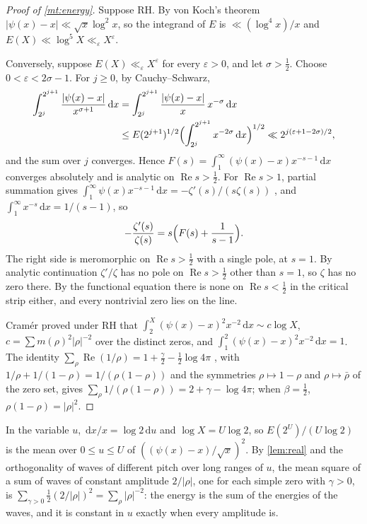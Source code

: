 \documentclass[11pt]{article}
\theoremstyle{definition}\newtheorem{definition}[theorem]{Definition}
\theoremstyle{remark}\newtheorem{remark}[theorem]{Remark}
\newcommand{\dd}{\,\mathrm d}\newcommand{\e}{\mathrm e}
\renewcommand{\Re}{\operatorname{Re}}\renewcommand{\Im}{\operatorname{Im}}
\begin{document}
\begin{proof}[Proof of \cref{mt:energy}]
Suppose RH. By von Koch's theorem \cite{vonKoch} $|\psi(x)-x|\ll\sqrt x\log^2x$, so the integrand of $E$ is $\ll(\log^4x)/x$ and $E(X)\ll\log^5X\ll_\varepsilon X^\varepsilon$.

Conversely, suppose $E(X)\ll_\varepsilon X^\varepsilon$ for every $\varepsilon>0$, and let $\sigma>\frac12$. Choose $0<\varepsilon<2\sigma-1$. For $j\ge0$, by Cauchy--Schwarz,
\begin{align*}
\int_{2^j}^{2^{j+1}}\frac{|\psi(x)-x|}{x^{\sigma+1}}\dd x&=\int_{2^j}^{2^{j+1}}\frac{|\psi(x)-x|}{x}\,x^{-\sigma}\dd x\\
&\le E(2^{j+1})^{1/2}\Bigl(\int_{2^j}^{2^{j+1}}x^{-2\sigma}\dd x\Bigr)^{1/2}\ll2^{j(\varepsilon+1-2\sigma)/2},
\end{align*}
and the sum over $j$ converges. Hence $F(s)=\int_1^\infty(\psi(x)-x)x^{-s-1}\dd x$ converges absolutely and is analytic on $\Re s>\frac12$. For $\Re s>1$, partial summation gives $\int_1^\infty\psi(x)x^{-s-1}\dd x=-\zeta'(s)/(s\zeta(s))$ \cite[Ch.~17]{Davenport}, and $\int_1^\infty x^{-s}\dd x=1/(s-1)$, so
\[
-\frac{\zeta'(s)}{\zeta(s)}=s\Bigl(F(s)+\frac1{s-1}\Bigr).
\]
The right side is meromorphic on $\Re s>\frac12$ with a single pole, at $s=1$. By analytic continuation $\zeta'/\zeta$ has no pole on $\Re s>\frac12$ other than $s=1$, so $\zeta$ has no zero there. By the functional equation there is none on $\Re s<\frac12$ in the critical strip either, and every nontrivial zero lies on the line.

Cramér \cite{Cramer} proved under RH that $\int_2^X(\psi(x)-x)^2x^{-2}\dd x\sim c\log X$, $c=\sum m(\rho)^2|\rho|^{-2}$ over the distinct zeros, and $\int_1^2(\psi(x)-x)^2x^{-2}\dd x=1$. The identity $\sum_\rho\Re(1/\rho)=1+\frac\gamma2-\frac12\log4\pi$ \cite[Ch.~12]{Davenport}, with $1/\rho+1/(1-\rho)=1/(\rho(1-\rho))$ and the symmetries $\rho\mapsto1-\rho$ and $\rho\mapsto\bar\rho$ of the zero set, gives $\sum_\rho1/(\rho(1-\rho))=2+\gamma-\log4\pi$; when $\beta=\frac12$, $\rho(1-\rho)=|\rho|^2$.
\end{proof}

In the variable $u$, $\dd x/x=\log2\dd u$ and $\log X=U\log2$, so $E(2^U)/(U\log2)$ is the mean over $0\le u\le U$ of $((\psi(x)-x)/\sqrt x)^2$. By \cref{lem:real} and the orthogonality of waves of different pitch over long ranges of $u$, the mean square of a sum of waves of constant amplitude $2/|\rho|$, one for each simple zero with $\gamma>0$, is $\sum_{\gamma>0}\frac12(2/|\rho|)^2=\sum_\rho|\rho|^{-2}$: the energy is the sum of the energies of the waves, and it is constant in $u$ exactly when every amplitude is.
\end{document}
